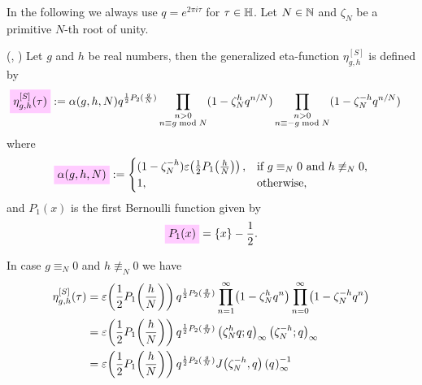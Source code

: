 \documentclass{article}
\begin{document}
In the following we always use $q = e^{2\pi i \tau}$ for $\tau \in
\mathbb{H}$.
%
Let $N \in \mathbb{N}$ and $\zeta_N$ be a primitive $N$-th root of unity.

\begin{Definition}
  (\cite{Schoeneberg_EllipticModularFunctions_1974},
  \cite[p.~672]{Yang_GeneralizedDedekindEtaFunctions_2004})
  Let $g$ and $h$ be
  real numbers, then the generalized eta-function $\eta_{g,h}^{[S]}$
  is defined by
\begin{align}
  \defineNotation[eta-g-h-tau-Schoeneberg]{\eta_{g,h}^{[S]}(\tau)}
  &:=
  \alpha(g,h,N) q^{\frac{1}{2} P_2(\frac{g}{N})}
  \prod_{\substack{n>0\\n\equiv g \bmod N}}
       (1-\zeta_N^h q^{n/N})
  \prod_{\substack{n>0\\n\equiv -g \bmod N}}
       (1-\zeta_N^{-h} q^{n/N})
  \label{eq:def:eta_g-h^[S](tau)}
\end{align}
where
\begin{gather}
  \defineNotation[alpha-g-h-N]{\alpha(g,h,N)}
  :=
  \begin{cases}
    (1 - \zeta_N^{-h}) \unityPower{\frac{1}{2} P_1\!\left(\frac{h}{N}\right)},
    &
    \text{if $g\equiv_N 0$ and $h\not\equiv_N 0$,}
    \\
    1, & \text{otherwise},
  \end{cases}
  \label{eq:eta_g-h^[S](tau)-prefactor}
\end{gather}
and $P_1(x)$ is the first Bernoulli function given by
\begin{gather*}
  \defineNotation[P-1]{P_1(x)}
  =
  \{x\} - \frac{1}{2}.
\end{gather*}

In case $g\equiv_N 0$ and $h\not\equiv_N 0$ we have
\begin{align*}
  \eta_{g,h}^{[S]}(\tau)
  &=
  \varepsilon\!\left(\frac{1}{2}
    P_1\!\left(\frac{h}{N}\right)\right)
    q^{\frac{1}{2} P_2(\frac{g}{N})}
  \prod_{n=1}^\infty
    \bigl(1-\zeta_N^h q^n\bigr)
  \prod_{n=0}^\infty
    \bigl(1-\zeta_N^{-h} q^n\bigr)
  \notag\\
  &=
  \varepsilon\!\left(\frac{1}{2}
    P_1\!\left(\frac{h}{N}\right)\right)
    q^{\frac{1}{2} P_2(\frac{g}{N})}
  \left( \zeta_N^h q;q \right)_{\infty}
  \left( \zeta_N^{-h};q \right)_{\infty}
  \notag\\
  &=
  \varepsilon\!\left(\frac{1}{2}
    P_1\!\left(\frac{h}{N}\right)\right)
    q^{\frac{1}{2} P_2(\frac{g}{N})}
    J\!\left(\zeta_N^{-h},q\right) \left({q}^{}\right)_{\infty}^{-1}
\end{align*}





\end{Definition}
\end{document}
